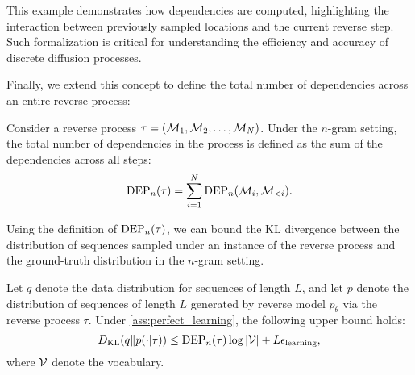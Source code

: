 \noindent This example demonstrates how dependencies are computed, highlighting the interaction between previously sampled locations and the current reverse step. Such formalization is critical for understanding the efficiency and accuracy of discrete diffusion processes.

Finally, we extend this concept to define the total number of dependencies across an entire reverse process:

\begin{definition}
    Consider a reverse process $\tau = ({\mathcal{M}}_1, {\mathcal{M}}_2, \dots, {\mathcal{M}}_N)$. Under the $n$-gram setting, the total number of dependencies in the process is defined as the sum of the dependencies across all steps:
    \[
    \operatorname{DEP}_n(\tau) = \sum_{i=1}^N \operatorname{DEP}_n({\mathcal{M}}_i, {\mathcal{M}}_{<i}).
    \]
\end{definition}

Using the definition of $\operatorname{DEP}_n(\tau)$, we can bound the KL divergence between the distribution of sequences sampled under an instance of the reverse process and the ground-truth distribution in the $n$-gram setting.

\begin{lemma}
\label{lemma:kl_upper_ins_rev}
    Let $q$ denote the data distribution for sequences of length $L$, and let $p$ denote the distribution of sequences of length $L$ generated by reverse model $p_\theta$ via the reverse process $\tau$. Under \cref{ass:perfect_learning}, the following upper bound holds:
    \[
    D_{\mathrm{KL}}(q\|p(\cdot|\tau)) \leq \operatorname{DEP}_n(\tau) \log |{\mathcal{V}}|+L{\epsilon}_\mathrm{learning},
    \]
    where ${\mathcal{V}}$ denote the vocabulary.
\end{lemma}


